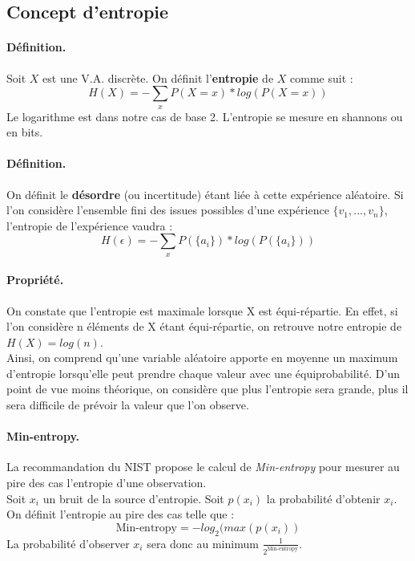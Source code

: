 \subsection{Concept d'entropie}
\paragraph{Définition.\\}
Soit $X$ est une V.A. discrète. On définit l'\textbf{entropie} de $X$ comme suit : 
$$H(X) = - \sum_x P(X=x)*log(P(X=x))	 $$ 
Le logarithme est dans notre cas de base 2. L'entropie se mesure en shannons ou en bits.\\

\paragraph{Définition.\\}
On définit le \textbf{désordre} (ou incertitude) étant liée à cette expérience aléatoire. Si l'on considère l'ensemble fini des issues possibles d'une expérience $\lbrace v_1,...,v_n \rbrace$, l'entropie de l'expérience vaudra :
$$H(\epsilon) = - \sum_x P(\lbrace a_i \rbrace)*log(P(\lbrace a_i \rbrace))	 $$ 

\paragraph{Propriété.\\} 
On constate que l'entropie est maximale lorsque X est équi-répartie. En effet, si l'on considère n éléments de X étant équi-répartie, on retrouve notre entropie de $H(X) = log(n)$. \\


Ainsi, on comprend qu'une variable aléatoire apporte en moyenne un maximum d'entropie lorsqu'elle peut prendre chaque valeur avec une équiprobabilité. D'un point de vue moins théorique, on considère que plus l'entropie sera grande, plus il sera difficile de prévoir la valeur que l'on observe.

\paragraph{Min-entropy.\\}
La recommandation du NIST propose le calcul de \textit{Min-entropy} pour mesurer au pire des cas l'entropie d'une observation. \\

Soit $x_i$ un bruit de la source d'entropie. Soit $p(x_i)$ la probabilité d'obtenir $x_i$. On définit l'entropie au pire des cas telle que : 
$$\text{Min-entropy}=-log_2(max(p(x_i))$$
La probabilité d'observer $x_i$ sera donc au minimum  $\frac{1}{2^\text{Min-entropy}}$.

